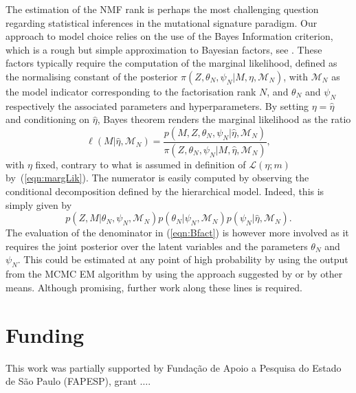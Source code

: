 \documentclass{bioinfo}
\newcommand{\Mord}{\mathcal{M}_N}
\begin{document}
The estimation of the NMF rank is perhaps the most challenging
question regarding statistical inferences in the mutational signature
paradigm. Our approach to model choice relies on the use of the Bayes
Information criterion, which is a rough but simple approximation to
Bayesian factors, see \cite{KR}. These factors typically require the
computation of the marginal likelihood, defined as the normalising
constant of the posterior $\pi(Z, \theta_N, \psi_N|M, \eta, \Mord)$,
with $\Mord$ as the model indicator corresponding to the factorisation
rank $N$, and $\theta_N$ and $\psi_N$ respectively the associated
parameters and hyperparameters. By setting $\eta = \hat\eta$ and
conditioning on $\hat\eta$, Bayes theorem renders the marginal
likelihood as the ratio
\begin{equation}
  \label{eqn:Bfact}
   \ell(M|\hat \eta, \Mord) 
  = 
    \frac{p(M, Z, \theta_N, \psi_N|\hat\eta, \Mord)}
    {\pi(Z, \theta_N, \psi_N|M, \hat\eta, \Mord)},
\end{equation}
with $\eta$ fixed, contrary to what is assumed in definition of
$\mathcal L(\eta; m)$ by~(\ref{eqn:margLik}). The numerator is easily
computed by observing the conditional decomposition defined by the
hierarchical model. Indeed, this is simply given by
\[
  p(Z, M|\theta_N, \psi_N, \Mord) p(\theta_N|\psi_N, \Mord)
  p(\psi_N|\hat\eta, \Mord).
\]
The evaluation of the denominator in (\ref{eqn:Bfact}) is however more
involved as it requires the joint posterior over the latent variables
and the parameters $\theta_N$ and $\psi_N$. This could be estimated at
any point of high probability by using the output from the MCMC EM
algorithm by using the approach suggested by \cite{Ch} or by other
means. Although promising, further work along these lines is
required.

\section*{Funding}
This work was partially supported by Funda\c{c}\~ao de Apoio a
Pesquisa do Estado de S\~ao Paulo (FAPESP), grant $\ldots$. 

 

\end{document}
